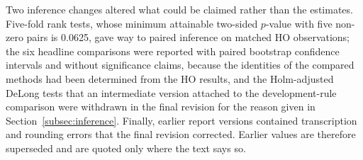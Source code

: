 \documentclass[final,5p,twocolumn]{elsarticle}
\providecommand{\DIFaddtex}[1]{{\protect\color{blue} \sf #1}} %
\providecommand{\DIFaddbegin}{} %
\providecommand{\DIFaddend}{} %
\providecommand{\DIFdelend}{} %
\providecommand{\DIFadd}[1]{\texorpdfstring{\DIFaddtex{#1}}{#1}} %
\begin{document}
\DIFdelend \DIFaddbegin \DIFadd{Two inference changes altered what could be claimed rather than the estimates. Five-fold rank tests, whose minimum attainable two-sided $p$-value with five non-zero pairs is 0.0625, gave way to paired inference on matched HO observations; the six headline comparisons were reported with paired bootstrap confidence intervals and without significance claims, because the identities of the compared methods had been determined from the HO results, and the Holm-adjusted DeLong tests that an intermediate version attached to the development-rule comparison were withdrawn in the final revision for the reason given in Section~\ref{subsec:inference}. Finally, earlier report versions contained transcription and rounding errors that the final revision corrected. Earlier values are therefore superseded and are quoted only where the text says so.
}\DIFaddend 
\end{document}
